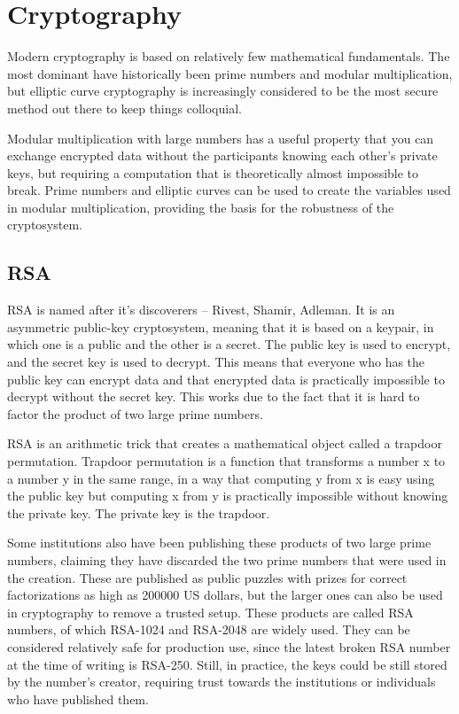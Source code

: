 \chapter{Cryptography}
\label{Cryptography}

Modern cryptography is based on relatively few mathematical fundamentals. The most dominant  have historically been prime numbers and modular multiplication, but elliptic curve cryptography is increasingly considered to be the most secure method out there to keep things colloquial.

Modular multiplication with large numbers has a useful property that you can exchange encrypted data without the participants knowing each other's private keys, but requiring a computation that is theoretically almost impossible to break. Prime numbers and elliptic curves can be used to create the variables used in modular multiplication, providing the basis for the robustness of the cryptosystem.

\section{RSA}
RSA is named after it's discoverers – Rivest, Shamir, Adleman. It is an asymmetric public-key cryptosystem, meaning that it is based on a keypair, in which one is a public and the other is a secret. The public key is used to encrypt, and the secret key is used to decrypt. This means that everyone who has the public key can encrypt data and that encrypted data is practically impossible to decrypt without the secret key. This works due to the fact that it is hard to factor the product of two large prime numbers.

RSA is an arithmetic trick that creates a mathematical object called a trapdoor permutation. Trapdoor permutation is a function that transforms a number x to a number y in the same range, in a way that computing y from x is easy using the public key but computing x from y is practically impossible without knowing the private key. The private key is the trapdoor.\cite{Aumasson2018-nh}

Some institutions also have been publishing these products of two large prime numbers, claiming they have discarded the two prime numbers that were used in the creation. These are published as public puzzles with prizes for correct factorizations as high as 200000 US dollars, but the larger ones can also be used in cryptography to remove a trusted setup. These products are called RSA numbers, of which RSA-1024 and RSA-2048 are widely used. They can be considered relatively safe for production use, since the latest broken RSA number at the time of writing is RSA-250. Still, in practice, the keys could be still stored by the number's creator, requiring trust towards the institutions or individuals who have published them.

